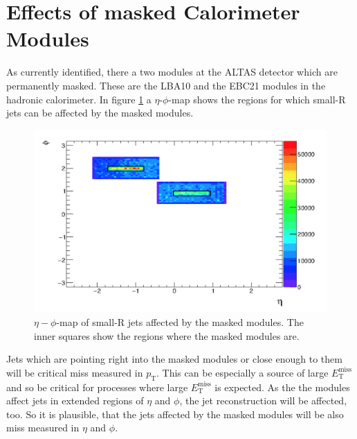 \section{Effects of masked Calorimeter Modules}
As currently identified, there a two modules at the ALTAS detector which are permanently masked.
These are the LBA10 and the EBC21 modules in the hadronic calorimeter.
In figure \ref{masked_modules} a $\eta$-$\phi$-map shows the regions for which small-R jets can be affected by the masked modules.
\begin{figure}[H]
	\centering
	\includegraphics[width=\textwidth]{./Plots/Masked_map.png}
	\caption{$\eta-\phi$-map of small-R jets affected by the masked modules. The inner squares show the regions where the masked modules are.\cite{RodriguezPerez:2126928}}
	\label{masked_modules}
\end{figure}
Jets which are pointing right into the masked modules or close enough to them will be critical miss measured in $p_{\text{T}}$.
This can be especially a source of large $E_{\mathrm{T}}^{\mathrm{miss}}$ and so be critical for processes where large $E_{\mathrm{T}}^{\mathrm{miss}}$ is expected.
As the the modules affect jets in extended regions of $\eta$ and $\phi$, the jet reconstruction will be affected, too.
So it is plausible, that the jets affected by the masked modules will be also miss measured in $\eta$ and $\phi$.

